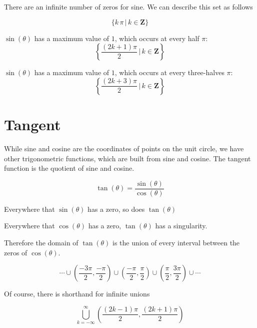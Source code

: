 \documentclass{ximera}
\begin{document}
There are an infinite number of zeros for sine.  We can describe this set as follows


\[  \{  k \, \pi   \, | \, k \in \textbf{Z}   \}      \]





$\sin(\theta)$ has a maximum value of $1$, which occurs at every half $\pi$:  
\[ \left\{  \frac{(2k+1)\pi}{2} \, | \, k \in \textbf{Z}\right\} \]



$\sin(\theta)$ has a maximum value of $1$, which occurs at every three-halves $\pi$:  
\[ \left\{  \frac{(2k+3)\pi}{2} \, | \, k \in \textbf{Z}\right\} \]











\section{Tangent}


While sine and cosine are the coordinates of points on the unit circle, we have other trigonometric functions, which are built from sine and cosine.  The tangent function is the quotient of sine and cosine.




\[ \tan(\theta) = \frac{\sin(\theta)}{\cos(\theta)} \]


Everywhere that $\sin(\theta)$ has a zero, so does $\tan(\theta)$

Everywhere that $\cos(\theta)$ has a zero, $\tan(\theta)$ has a singularity.


Therefore the domain of $\tan(\theta)$ is the union of every interval between the zeros of $\cos(\theta)$.


\[      \cdots   \cup  \left(\frac{-3\pi}{2}, \frac{-\pi}{2}\right) \cup \left(\frac{-\pi}{2}, \frac{\pi}{2}\right) \cup \left(\frac{\pi}{2} , \frac{3\pi}{2}\right) \cup \cdots              \]


Of course, there is shorthand for infinite unions







\[    \bigcup^\infty_{k=-\infty} \left(\frac{(2k-1)\pi}{2}, \frac{(2k+1)\pi}{2}\right)   \]
\end{document}
